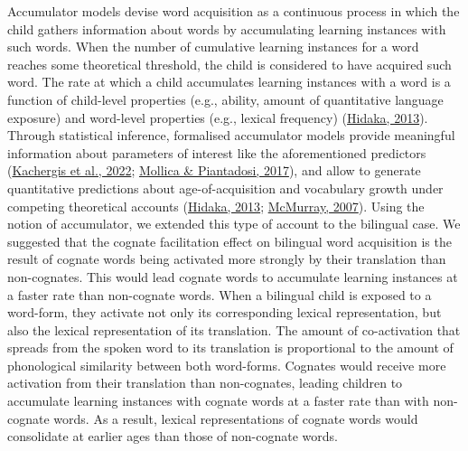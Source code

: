 \documentclass[
]{article}
\begin{document}
Accumulator models devise word acquisition as a continuous process in
which the child gathers information about words by accumulating learning
instances with such words. When the number of cumulative learning
instances for a word reaches some theoretical threshold, the child is
considered to have acquired such word. The rate at which a child
accumulates learning instances with a word is a function of child-level
properties (e.g., ability, amount of quantitative language exposure) and
word-level properties (e.g., lexical frequency)
(\protect\hyperlink{ref-hidaka2013computational}{Hidaka, 2013}). Through
statistical inference, formalised accumulator models provide meaningful
information about parameters of interest like the aforementioned
predictors (\protect\hyperlink{ref-kachergis2022standard}{Kachergis et
al., 2022}; \protect\hyperlink{ref-mollica2017how}{Mollica \&
Piantadosi, 2017}), and allow to generate quantitative predictions about
age-of-acquisition and vocabulary growth under competing theoretical
accounts (\protect\hyperlink{ref-hidaka2013computational}{Hidaka, 2013};
\protect\hyperlink{ref-mcmurray2007defusing}{McMurray, 2007}). Using the
notion of accumulator, we extended this type of account to the bilingual
case. We suggested that the cognate facilitation effect on bilingual
word acquisition is the result of cognate words being activated more
strongly by their translation than non-cognates. This would lead cognate
words to accumulate learning instances at a faster rate than non-cognate
words. When a bilingual child is exposed to a word-form, they activate
not only its corresponding lexical representation, but also the lexical
representation of its translation. The amount of co-activation that
spreads from the spoken word to its translation is proportional to the
amount of phonological similarity between both word-forms. Cognates
would receive more activation from their translation than non-cognates,
leading children to accumulate learning instances with cognate words at
a faster rate than with non-cognate words. As a result, lexical
representations of cognate words would consolidate at earlier ages than
those of non-cognate words.
\end{document}
